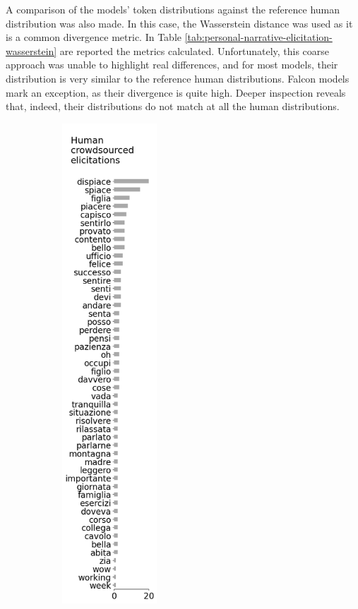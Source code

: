 
A comparison of the models' token distributions against the reference human distribution was also made. In this case, the Wasserstein distance \cite{wasserstein} was used as it is a common divergence metric. In Table \ref{tab:personal-narrative-elicitation-wasserstein} are reported the metrics calculated. Unfortunately, this coarse approach was unable to highlight real differences, and for most models, their distribution is very similar to the reference human distributions. Falcon models mark an exception, as their divergence is quite high. Deeper inspection reveals that, indeed, their distributions do not match at all the human distributions. 
\begin{figure}[!htbp]
    \centering
    \begin{subfigure}[t]{0.25\textwidth}
        \centering
        \includegraphics[height=18cm]{assets/imgs/dataset-test-set-top-50-answers-vertical.png}

\end{subfigure}
\end{figure}
